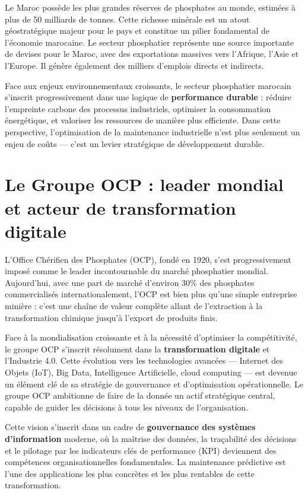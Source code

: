 \documentclass[a4paper,12pt]{report}
\begin{document}
Le Maroc possède les plus grandes réserves de phosphates au monde, estimées à plus de 50 milliards de tonnes. Cette richesse minérale est un atout géostratégique majeur pour le pays et constitue un pilier fondamental de l'économie marocaine. Le secteur phosphatier représente une source importante de devises pour le Maroc, avec des exportations massives vers l'Afrique, l'Asie et l'Europe. Il génère également des milliers d'emplois directs et indirects.

Face aux enjeux environnementaux croissants, le secteur phosphatier marocain s'inscrit progressivement dans une logique de \textbf{performance durable} : réduire l'empreinte carbone des processus industriels, optimiser la consommation énergétique, et valoriser les ressources de manière plus efficiente. Dans cette perspective, l'optimisation de la maintenance industrielle n'est plus seulement un enjeu de coûts — c'est un levier stratégique de développement durable.

\section*{Le Groupe OCP : leader mondial et acteur de transformation digitale}

L'Office Chérifien des Phosphates (OCP), fondé en 1920, s'est progressivement imposé comme le leader incontournable du marché phosphatier mondial. Aujourd'hui, avec une part de marché d'environ 30\% des phosphates commercialisés internationalement, l'OCP est bien plus qu'une simple entreprise minière : c'est une chaîne de valeur complète allant de l'extraction à la transformation chimique jusqu'à l'export de produits finis.

Face à la mondialisation croissante et à la nécessité d'optimiser la compétitivité, le groupe OCP s'inscrit résolument dans la \textbf{transformation digitale} et l'Industrie 4.0. Cette évolution vers les technologies avancées — Internet des Objets (IoT), Big Data, Intelligence Artificielle, cloud computing — est devenue un élément clé de sa stratégie de gouvernance et d'optimisation opérationnelle. Le groupe OCP ambitionne de faire de la donnée un actif stratégique central, capable de guider les décisions à tous les niveaux de l'organisation.

Cette vision s'inscrit dans un cadre de \textbf{gouvernance des systèmes d'information} moderne, où la maîtrise des données, la traçabilité des décisions et le pilotage par les indicateurs clés de performance (KPI) deviennent des compétences organisationnelles fondamentales. La maintenance prédictive est l'une des applications les plus concrètes et les plus rentables de cette transformation.
\end{document}
